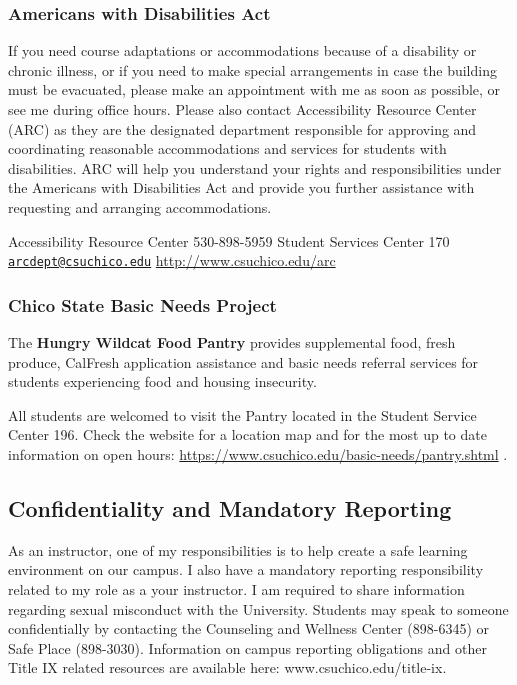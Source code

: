 \documentclass[
  11pt,
]{article}
\begin{document}
\subsubsection{Americans with Disabilities
Act}\label{americans-with-disabilities-act}

If you need course adaptations or accommodations because of a disability
or chronic illness, or if you need to make special arrangements in case
the building must be evacuated, please make an appointment with me as
soon as possible, or see me during office hours. Please also contact
Accessibility Resource Center (ARC) as they are the designated
department responsible for approving and coordinating reasonable
accommodations and services for students with disabilities. ARC will
help you understand your rights and responsibilities under the Americans
with Disabilities Act and provide you further assistance with requesting
and arranging accommodations.

Accessibility Resource Center 530-898-5959 Student Services Center 170
\href{mailto:arcdept@csuchico.edu}{\nolinkurl{arcdept@csuchico.edu}}
\url{http://www.csuchico.edu/arc}

\subsubsection{Chico State Basic Needs
Project}\label{chico-state-basic-needs-project}

The \textbf{Hungry Wildcat Food Pantry} provides supplemental food,
fresh produce, CalFresh application assistance and basic needs referral
services for students experiencing food and housing insecurity.

All students are welcomed to visit the Pantry located in the Student
Service Center 196. Check the website for a location map and for the
most up to date information on open hours:
\url{https://www.csuchico.edu/basic-needs/pantry.shtml} .

\subsection{Confidentiality and Mandatory
Reporting}\label{confidentiality-and-mandatory-reporting}

As an instructor, one of my responsibilities is to help create a safe
learning environment on our campus. I also have a mandatory reporting
responsibility related to my role as a your instructor. I am required to
share information regarding sexual misconduct with the University.
Students may speak to someone confidentially by contacting the
Counseling and Wellness Center (898-6345) or Safe Place (898-3030).
Information on campus reporting obligations and other Title IX related
resources are available here: www.csuchico.edu/title-ix.
\end{document}
